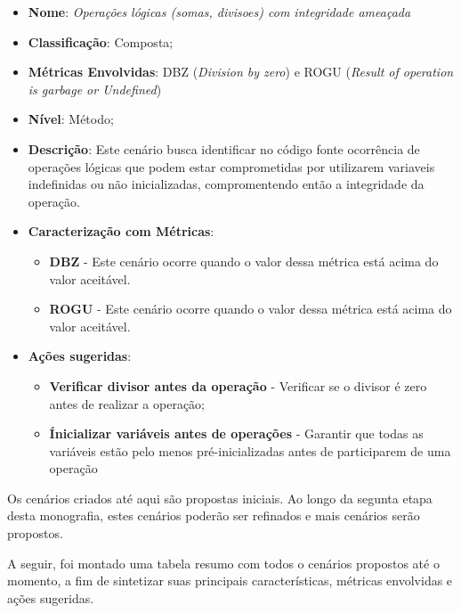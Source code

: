 \begin{itemize}
\item \textbf{Nome}: \emph{Operações lógicas (somas, divisoes) com integridade ameaçada}
\item \textbf{Classificação}: Composta;
\item \textbf{Métricas Envolvidas}: DBZ (\emph{Division by zero}) e ROGU (\emph{Result of operation is garbage or Undefined}) 
\item \textbf{Nível}: Método;
\item \textbf{Descrição}: Este cenário busca identificar no código fonte ocorrência de operações lógicas que podem estar comprometidas por utilizarem variaveis indefinidas ou não inicializadas, compromentendo então a integridade da operação.
\item \textbf{Caracterização com Métricas}: 
	\begin{itemize}
	\item \textbf{DBZ} - Este cenário ocorre quando o valor dessa métrica está acima do valor aceitável.
	\item \textbf{ROGU} - Este cenário ocorre quando o valor dessa métrica está acima do valor aceitável.
	\end{itemize}
\item \textbf{Ações sugeridas}: 
	\begin{itemize}
	\item \textbf{Verificar divisor antes da operação} - Verificar se o divisor é zero antes de realizar a operação;  
	\item \textbf{Ínicializar variáveis antes de operações} - Garantir que todas as variáveis estão pelo menos pré-inicializadas antes de participarem de uma operação 
	 
	\end{itemize}
\end{itemize}


Os cenários criados até aqui são propostas iniciais. Ao longo da segunta etapa desta monografia, estes cenários poderão ser refinados e mais cenários serão propostos.

A seguir, foi montado uma tabela resumo com todos o cenários propostos até o momento, a fim de sintetizar suas principais características, métricas envolvidas e ações sugeridas.


